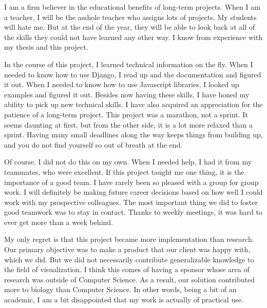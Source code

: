 
I am a firm believer in the educational benefits of long-term projects.
When I am a teacher, I will be the asshole teacher who assigns lots of projects.
My students will hate me.
But at the end of the year, they will be able to look back at all of the skills they could not have learned any other way.
I know from experience with my thesis and this project.

In the course of this project, I learned technical information on the fly.
When I needed to know how to use Django, I read up and the documentation and figured it out.
When I needed to know how to use Javascript libraries, I looked up examples and figured it out.
Besides now having these skills, I have honed my ability to pick up new technical skills.
I have also acquired an appreciation for the patience of a long-term project.
This project was a marathon, not a sprint.
It seems daunting at first, but from the other side, it is a lot more relaxed than a sprint.
Having many small deadlines along the way keeps things from building up, and you do not find yourself so out of breath at the end.

Of course, I did not do this on my own.
When I needed help, I had it from my teammates, who were excellent.
If this project taught me one thing, it is the importance of a good team.
I have rarely been so pleased with a group for group work.
I will definitely be making future career decisions based on how well I could work with my prospective colleagues.
The most important thing we did to foster good teamwork was to stay in contact.
Thanks to weekly meetings, it was hard to ever get more than a week behind.

My only regret is that this project became more implementation than research.
Our primary objective was to make a product that our client was happy with, which we did.
But we did not necessarily contribute generalizable knowledge to the field of visualization.
I think this comes of having a sponsor whose area of research was outside of Computer Science.
As a result, our solution contributed more to biology than Computer Science.
In other words, being a bit of an academic, I am a bit disappointed that my work is actually of practical use.
